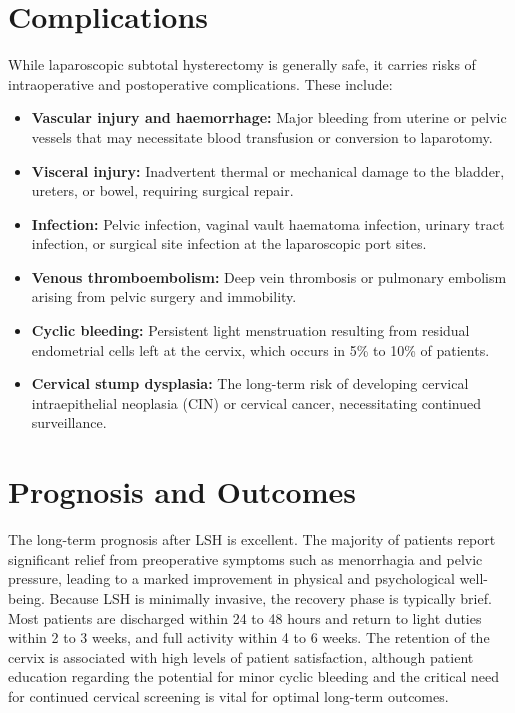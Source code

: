 \section*{Complications}
While laparoscopic subtotal hysterectomy is generally safe, it carries risks of intraoperative and postoperative complications. These include:
\begin{itemize}
    \item \textbf{Vascular injury and haemorrhage:} Major bleeding from uterine or pelvic vessels that may necessitate blood transfusion or conversion to laparotomy.
    \item \textbf{Visceral injury:} Inadvertent thermal or mechanical damage to the bladder, ureters, or bowel, requiring surgical repair.
    \item \textbf{Infection:} Pelvic infection, vaginal vault haematoma infection, urinary tract infection, or surgical site infection at the laparoscopic port sites.
    \item \textbf{Venous thromboembolism:} Deep vein thrombosis or pulmonary embolism arising from pelvic surgery and immobility.
    \item \textbf{Cyclic bleeding:} Persistent light menstruation resulting from residual endometrial cells left at the cervix, which occurs in 5\% to 10\% of patients.
    \item \textbf{Cervical stump dysplasia:} The long-term risk of developing cervical intraepithelial neoplasia (CIN) or cervical cancer, necessitating continued surveillance.
\end{itemize}

\section*{Prognosis and Outcomes}
The long-term prognosis after LSH is excellent. The majority of patients report significant relief from preoperative symptoms such as menorrhagia and pelvic pressure, leading to a marked improvement in physical and psychological well-being. Because LSH is minimally invasive, the recovery phase is typically brief. Most patients are discharged within 24 to 48 hours and return to light duties within 2 to 3 weeks, and full activity within 4 to 6 weeks. The retention of the cervix is associated with high levels of patient satisfaction, although patient education regarding the potential for minor cyclic bleeding and the critical need for continued cervical screening is vital for optimal long-term outcomes.

